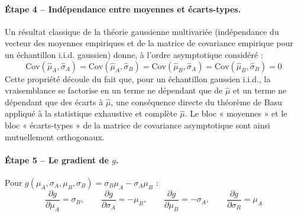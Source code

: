 \documentclass{article}
\begin{document}
\paragraph{Étape 4 -- Indépendance entre moyennes et écarts-types.} Un résultat classique de la théorie gaussienne multivariée (indépendance du vecteur des moyennes empiriques et de la matrice de covariance empirique pour un échantillon i.i.d. gaussien) donne, à l'ordre asymptotique considéré :
\begin{equation}
\text{Cov}(\hat\mu_A,\hat\sigma_A)=\text{Cov}(\hat\mu_A,\hat\sigma_B)=\text{Cov}(\hat\mu_B,\hat\sigma_A)=\text{Cov}(\hat\mu_B,\hat\sigma_B)=0
\end{equation}
Cette propriété découle du fait que, pour un échantillon gaussien i.i.d., la vraisemblance se factorise en un terme ne dépendant que de $\hat\mu$ et un terme ne dépendant que des écarts à $\hat\mu$, une conséquence directe du théorème de Basu appliqué à la statistique exhaustive et complète $\hat\mu$. Le bloc « moyennes » et le bloc « écarts-types » de la matrice de covariance asymptotique sont ainsi mutuellement orthogonaux.
\paragraph{Étape 5 -- Le gradient de $g$.} Pour $g(\mu_A,\sigma_A,\mu_B,\sigma_B)=\sigma_B\mu_A-\sigma_A\mu_B$ :
\begin{equation}
\frac{\partial g}{\partial \mu_A}=\sigma_B, \qquad \frac{\partial g}{\partial \sigma_A}=-\mu_B, \qquad \frac{\partial g}{\partial \mu_B}=-\sigma_A, \qquad \frac{\partial g}{\partial \sigma_B}=\mu_A
\end{equation}
\end{document}
